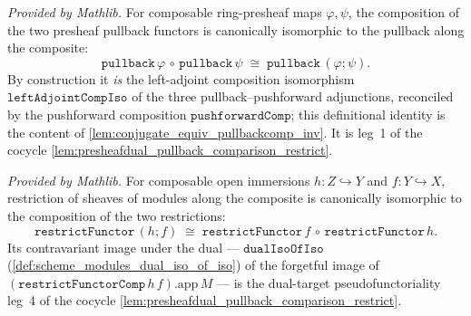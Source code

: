 
\begin{lemma}
  \label{lem:presheafofmodules_pullbackcomp}
  \mathlibok
  \textit{Provided by Mathlib.}
  For composable ring-presheaf maps \(\varphi, \psi\), the composition of the two presheaf pullback
  functors is canonically isomorphic to the pullback along the composite:
  \[
    \mathtt{pullback}\,\varphi \,\circ\, \mathtt{pullback}\,\psi
      \;\cong\; \mathtt{pullback}\,(\varphi \mathbin{;} \psi).
  \]
  By construction it \emph{is} the left-adjoint composition isomorphism
  \(\mathtt{leftAdjointCompIso}\) of the three pullback--pushforward adjunctions, reconciled by the
  pushforward composition \(\mathtt{pushforwardComp}\); this definitional identity is the content of
  \cref{lem:conjugate_equiv_pullbackcomp_inv}. It is leg~1 of the cocycle
  \cref{lem:presheafdual_pullback_comparison_restrict}.
\end{lemma}

\begin{lemma}
  \label{lem:scheme_modules_restrictfunctorcomp}
  \mathlibok
  \textit{Provided by Mathlib.}
  For composable open immersions \(h : Z \hookrightarrow Y\) and \(f : Y \hookrightarrow X\), restriction
  of sheaves of modules along the composite is canonically isomorphic to the composition of the two
  restrictions:
  \[
    \mathtt{restrictFunctor}\,(h \mathbin{;} f)
      \;\cong\; \mathtt{restrictFunctor}\,f \,\circ\, \mathtt{restrictFunctor}\,h .
  \]
  Its contravariant image under the dual --- \(\mathtt{dualIsoOfIso}\)
  (\cref{def:scheme_modules_dual_iso_of_iso}) of the forgetful image of
  \((\mathtt{restrictFunctorComp}\,h\,f).\mathrm{app}\,M\) --- is the dual-target pseudofunctoriality
  leg~4 of the cocycle \cref{lem:presheafdual_pullback_comparison_restrict}.
\end{lemma}


